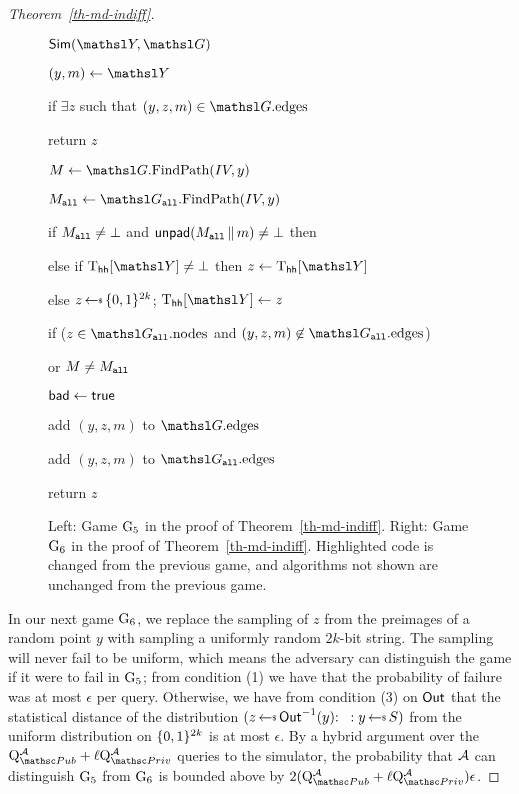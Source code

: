 \begin{proof}[Theorem~\ref{th-md-indiff}]
\begin{figure}
{		\begin{algorithm}{$\simulator(\YEDSA, \graph)$}
			\item $(y, m) \gets \YEDSA$
			\item if $\exists z$ such that $(y, z, m) \in \graph.\edges$
			\item \quad return $z$
			\item $\msg \gets \graph.\ppathO(\IV, y)$
			\item $\msg_{\all} \gets \graph_{\all}.\ppathO(\IV, y)$
			\item if ${M}_{\texttt{all}} \neq \bot$ and $\mathsf{unpad}({M}_{\texttt{all}} {\,\|\,} m) \neq \bot$ then
			\item \quad {}
			\item \quad {}
			\item \qquad {}
			\item \quad {}
			\item else if $\Thh[\YEDSA] \neq \bot$ then $z \gets \Thh[\YEDSA]$
			\item else $z \getsr \bits^{2k}$; $\Thh[\YEDSA] \gets z$
			\item if ($z \in \graph_{\all}.\nodes$ and $(y, z, m) \not\in \graph_{\all}.\edges$)
			\item \quad or ${M} \neq {M}_{\texttt{all}}$
			\item \qquad $\mathsf{bad} \gets \mathsf{true}$
			\item add $(y, z, m)$ to $\graph.\edges$
			\item add $(y, z, m)$ to $\graph_{\all}.\edges$
			\item return $z$
\end{algorithm}}
	\vspace{5pt}
	\caption{Left: Game $\textnormal{G}_5$ in the proof of Theorem~\ref{th-md-indiff}. Right:  Game $\textnormal{G}_6$ in the proof of Theorem~\ref{th-md-indiff}. Highlighted code is changed from the previous game, and algorithms not shown are unchanged from the previous game.}
	\label{fig-chop-gm5}
	\label{fig-chop-gm6}
\end{figure} 

In our next game $\textnormal{G}_6$, we replace the sampling of $z$ from the preimages of a random point $y$ with sampling a uniformly random $2k$-bit string.
The sampling will never fail to be uniform, which means the adversary can distinguish the game if it were to fail in $\textnormal{G}_5$; from condition (1) we have that the probability of failure was
at most $\epsilon$ per query.
Otherwise, we have from condition (3) on $\mathsf{Out}$ that the statistical distance of the distribution $(z \getsr \Out^{-1}(y) \Colon: y \getsr \S)$ from the uniform distribution on $\{0,1\}^{2k}$ is at most $\epsilon$.
By a hybrid argument over the $\Queries{\PubO}{\advA} + \ell \Queries{\PrivO}{\advA}$ queries to the simulator,
the probability that $\mathcal{A}$ can distinguish $\textnormal{G}_5$ from $\textnormal{G}_6$ is bounded above by $2(\Queries{\PubO}{\advA} + \ell \Queries{\PrivO}{\advA}) \epsilon$.


\end{proof}
